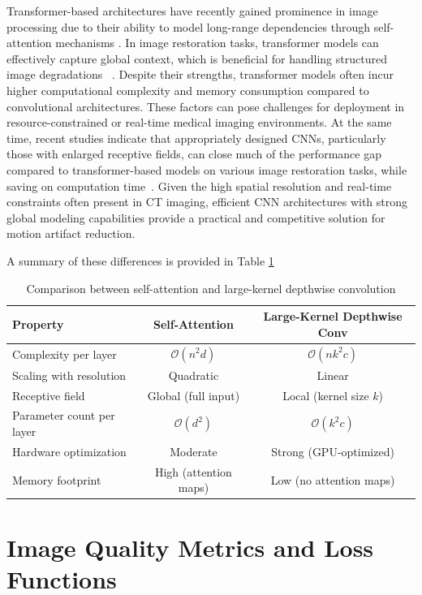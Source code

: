 Transformer-based architectures have recently gained prominence in image processing due to their ability to model long-range dependencies through self-attention mechanisms \cite{vaswani2017attention}. In image restoration tasks, transformer models can effectively capture global context, which is beneficial for handling structured image degradations ~\cite{restormer2022}. 
Despite their strengths, transformer models often incur higher computational complexity and memory consumption compared to convolutional architectures. These factors can pose challenges for deployment in resource-constrained or real-time medical imaging environments. 
At the same time, recent studies indicate that appropriately designed CNNs, particularly those with enlarged receptive fields, can close much of the performance gap compared to transformer-based models on various image restoration tasks, while saving on computation time~\cite{replknet2022}. Given the high spatial resolution and real-time constraints often present in CT imaging, efficient CNN architectures with strong global modeling capabilities provide a practical and competitive solution for motion artifact reduction.

A summary of these differences is provided in Table \ref{tab:attention_vs_lk} 
\begin{table}[H]
\centering
\caption{Comparison between self-attention and large-kernel depthwise convolution}
\label{tab:attention_vs_lk}
\renewcommand{\arraystretch}{1.2}
\begin{tabular}{lcc}
\toprule
\textbf{Property} & \textbf{Self-Attention} & \textbf{Large-Kernel Depthwise Conv} \\
\midrule
Complexity per layer & $\mathcal{O}(n^2 d)$ & $\mathcal{O}(n k^2 c)$ \\
Scaling with resolution & Quadratic & Linear \\
Receptive field & Global (full input) & Local (kernel size $k$) \\
Parameter count per layer & $\mathcal{O}(d^2)$ & $\mathcal{O}(k^2 c)$ \\
Hardware optimization & Moderate & Strong (GPU-optimized) \\
Memory footprint & High (attention maps) & Low (no attention maps) \\
\bottomrule
\end{tabular}
\end{table}

\section{Image Quality Metrics and Loss Functions}


